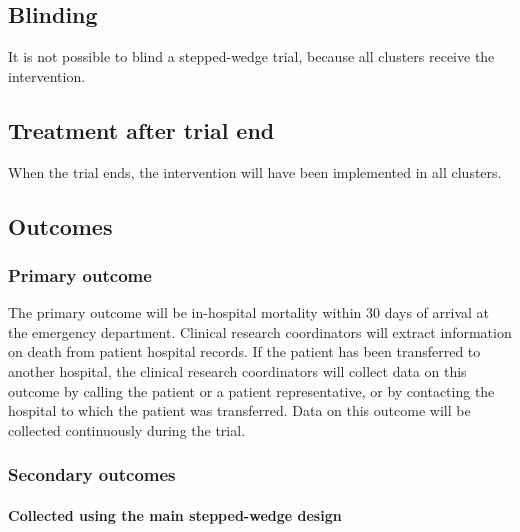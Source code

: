 \documentclass[
]{scrartcl}
\let\oldparagraph\paragraph
\renewcommand{\paragraph}[1]{\oldparagraph{#1}\mbox{}}
\begin{document}
\hypertarget{blinding}{%
\subsection{Blinding}\label{blinding}}

It is not possible to blind a stepped-wedge trial, because all clusters
receive the intervention.

\hypertarget{treatment-after-trial-end}{%
\subsection{Treatment after trial end}\label{treatment-after-trial-end}}

When the trial ends, the intervention will have been implemented in all
clusters.

\hypertarget{outcomes}{%
\subsection{Outcomes}\label{outcomes}}

\hypertarget{primary-outcome}{%
\subsubsection{Primary outcome}\label{primary-outcome}}

The primary outcome will be in-hospital mortality within 30 days of
arrival at the emergency department. Clinical research coordinators will
extract information on death from patient hospital records. If the
patient has been transferred to another hospital, the clinical research
coordinators will collect data on this outcome by calling the patient or
a patient representative, or by contacting the hospital to which the
patient was transferred. Data on this outcome will be collected
continuously during the trial.

\hypertarget{secondary-outcomes}{%
\subsubsection{Secondary outcomes}\label{secondary-outcomes}}

\hypertarget{collected-using-the-main-stepped-wedge-design}{%
\paragraph{Collected using the main stepped-wedge
design}\label{collected-using-the-main-stepped-wedge-design}}
\end{document}
